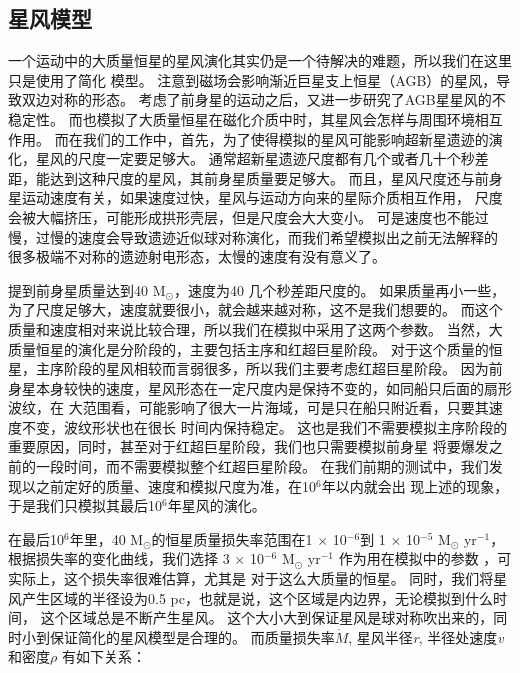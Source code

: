 \subsection{星风模型}
一个运动中的大质量恒星的星风演化其实仍是一个待解决的难题，所以我们在这里只是使用了简化
模型。
\citet{vanMarle2014}注意到磁场会影响渐近巨星支上恒星（AGB）的星风，导致双边对称的形态。
考虑了前身星的运动之后，\citet{vanMarle2014a}又进一步研究了AGB星星风的不稳定性。
而\citet{Meyer2017}也模拟了大质量恒星在磁化介质中时，其星风会怎样与周围环境相互作用。
而在我们的工作中，首先，为了使得模拟的星风可能影响超新星遗迹的演化，星风的尺度一定要足够大。
通常超新星遗迹尺度都有几个或者几十个秒差距，能达到这种尺度的星风，其前身星质量要足够大。
而且，星风尺度还与前身星运动速度有关，如果速度过快，星风与运动方向来的星际介质相互作用，
尺度会被大幅挤压，可能形成拱形壳层，但是尺度会大大变小。
可是速度也不能过慢，过慢的速度会导致遗迹近似球对称演化，而我们希望模拟出之前无法解释的
很多极端不对称的遗迹射电形态，太慢的速度有没有意义了。

\citet{Meyer2014}提到前身星质量达到40 M$_{\odot}$，速度为40 
几个秒差距尺度的。
如果质量再小一些，为了尺度足够大，速度就要很小，就会越来越对称，这不是我们想要的。
而这个质量和速度相对来说比较合理，所以我们在模拟中采用了这两个参数。
当然，大质量恒星的演化是分阶段的，主要包括主序和红超巨星阶段。
对于这个质量的恒星，主序阶段的星风相较而言弱很多，所以我们主要考虑红超巨星阶段。
因为前身星本身较快的速度，星风形态在一定尺度内是保持不变的，如同船只后面的扇形波纹，在
大范围看，可能影响了很大一片海域，可是只在船只附近看，只要其速度不变，波纹形状也在很长
时间内保持稳定。
这也是我们不需要模拟主序阶段的重要原因，同时，甚至对于红超巨星阶段，我们也只需要模拟前身星
将要爆发之前的一段时间，而不需要模拟整个红超巨星阶段。
在我们前期的测试中，我们发现以之前定好的质量、速度和模拟尺度为准，在10$^{6}$年以内就会出
现上述的现象，于是我们只模拟其最后10$^{6}$年星风的演化。

在最后10$^{6}$年里，40 M$_{\odot}$的恒星质量损失率范围在1 $\times$ 10$^{-6}$到
1 $\times$ 10$^{-5}$ M$_{\odot}$ yr$^{-1}$，根据损失率的变化曲线，我们选择
3 $\times$ 10$^{-6}$ M$_{\odot}$ yr$^{-1}$ 作为用在模拟中的参数
\citep{Meyer2014, vanMarle2012, vanMarle2015}，可实际上，这个损失率很难估算，尤其是
对于这么大质量的恒星\citep{Meyer2014a, Gvaramadze2014}。
同时，我们将星风产生区域的半径设为0.5 pc，也就是说，这个区域是内边界，无论模拟到什么时间，
这个区域总是不断产生星风。
这个大小大到保证星风是球对称吹出来的，同时小到保证简化的星风模型是合理的。
而质量损失率\textit{$\dot{M}$}, 星风半径\textit{r}, 半径处速度\textit{v}和密度\textit{$\rho$}
有如下关系：


